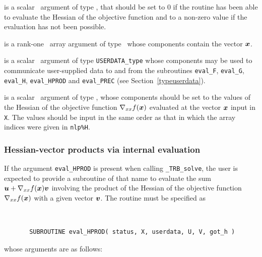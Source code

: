 \documentclass{galahad}
\newcommand{\packagename}{TRB}
\newcommand{\fullpackagename}{\libraryname\_\packagename}
\newcommand{\solver}{{\tt \fullpackagename\_solve}}
\begin{document}
\begin{description}
 is a scalar \intentout\ argument of type \integer,
that should be set to 0 if the routine has been able to evaluate
the Hessian of the objective function
and to a non-zero value if the evaluation has not been possible.

 is a rank-one \intentin\ array argument of type \realdp\
whose components contain the vector ${\bm{x}}$.

 is a scalar \intentinout\ argument of type
{\tt USERDATA\_type} whose components may be used
to communicate user-supplied data to and from the
subroutines {\tt eval\_F}, {\tt eval\_G},
{\tt eval\_H}, {\tt eval\_HPROD} and {\tt eval\_PREC}
(see Section~\ref{typeuserdata}).

 is a scalar \intentout\ argument of type \realdp,
whose components should be set to the values of the Hessian
of the objective function $\nabla_{xx} f({\bm{x}})$
evaluated at the vector ${\bm{x}}$ input in {\tt X}. The values should
be input in the same order as that in which the array indices were
given in {\tt nlp\%H}.

\end{description}


\subsubsection{Hessian-vector products via internal evaluation\label{hvfv}}

If the argument {\tt eval\_HPROD} is present when calling \solver, the
user is expected to provide a subroutine of that name to evaluate the
sum ${\bm{u}} + \nabla_{xx} f({\bm{x}}) {\bm{v}}$ involving the
product of the Hessian of the objective function $\nabla_{xx} f({\bm{x}})$
with a given vector ${\bm{v}}$.
The routine must be specified as

\def\baselinestretch{0.8}
{\tt
\begin{verbatim}
       SUBROUTINE eval_HPROD( status, X, userdata, U, V, got_h )
\end{verbatim} }
\def\baselinestretch{1.0}
\noindent whose arguments are as follows:
\end{document}
